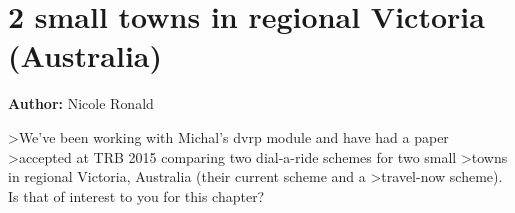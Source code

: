 \section{2 small towns in regional Victoria (Australia)}
\label{sec:victoria}
\hfill \textbf{Author:} Nicole Ronald


>We've been working with Michal's dvrp module and have had a paper
>accepted at TRB 2015 comparing two dial-a-ride schemes for two small
>towns in regional Victoria, Australia (their current scheme and a
>travel-now scheme). Is that of interest to you for this chapter?
